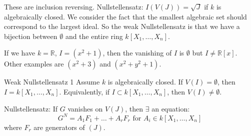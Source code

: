 \documentclass{report}
\begin{document}
These are inclusion reversing. Nullstellensatz: $I(V(J)) = \sqrt{J}$ if $k$ is algebraically closed. We consider the fact that the smallest algebraic set should correspond to the largest ideal. So the weak Nullstellensatz is that we have a bijection between $\emptyset$ and the entire ring $k[X_{1}, \ldots, X_{n}]$. 
    \begin{examples}
        \begin{example}
            If we have $k = \mathbb{R}$, $I = (x^{2} + 1)$, then the vanishing of $I$ is $\emptyset$ but $I \neq \mathbb{R}[x]$. Other examples are $(x^{2} + 3)$ and $(x^{2} + y^{2} + 1)$.
        \end{example}
    \end{examples}

\begin{theorem}{Weak Nullstellensatz 1}
    Assume $k$ is algebraically closed. If $V(I) = \emptyset$, then $I = k[X_{1}, \ldots, X_{n}]$. Equivalently, if $I \subset k[X_{1}, \ldots, X_{n}]$, then $V(I) \neq \emptyset$.
\end{theorem} 

Nullstellensatz: If $G$ vanishes on $V(J)$, then $\exists $ an equation:
    \begin{equation*}
        G^{N} = A_{1}F_{1} + \ldots + A_{r}F_{r} \text{ for } A_{i} \in k[X_{1}, \ldots, X_{n}]
    \end{equation*}
where $F_{r}$ are generators of $(J)$.
\end{document}
